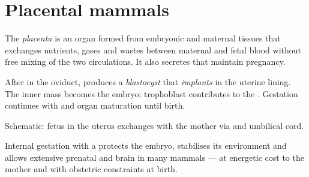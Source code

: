 \section{Placental mammals}

\begin{definition}[Placenta]\label{def:g12:reproduction-development:placenta}
The \emph{placenta} is an organ formed from embryonic
and maternal tissues that exchanges nutrients, gases and wastes between
maternal and fetal blood without free mixing of the two circulations.
It also secretes  that maintain pregnancy.
\end{definition}

\begin{definition}
\label{def:g12:reproduction-development:human}
After  in the oviduct,  produces a
\emph{blastocyst} that \emph{implants}
in the uterine lining. The inner  mass becomes the embryo; trophoblast
contributes to the . Gestation continues with  and
organ maturation until birth.
\end{definition}

\begin{omfigure}

{\small Schematic: fetus in the uterus exchanges with the mother via
 and umbilical cord.}
\end{omfigure}

\begin{proposition}
\label{prop:g12:reproduction-development:placenta-adv}
Internal gestation with a  protects the embryo, stabilises its
environment and allows extensive prenatal  and brain 
in many mammals --- at energetic cost to the mother and with obstetric
constraints at birth.
\end{proposition}
\admitted

